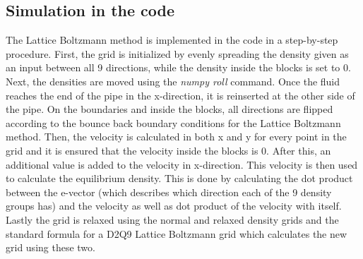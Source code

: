 \documentclass[a4paper]{article}
\begin{document}
\begin{multicols*}{2}
\subsection*{Simulation in the code}
The Lattice Boltzmann method is implemented in the code in a step-by-step procedure. First, the grid is initialized by evenly spreading the density given as an input between all 9 directions, while the density inside the blocks is set to 0. Next, the densities are moved using the \emph{numpy roll} command. Once the fluid reaches the end of the pipe in the x-direction, it is reinserted at the other side of the pipe.  On the boundaries and inside the blocks, all directions are flipped according to the bounce back boundary conditions for the Lattice Boltzmann method. Then, the velocity is calculated in both x and y for every point in the grid and it is ensured that the velocity inside the blocks is 0. After this, an additional value is added to the velocity in x-direction. This velocity is then used to calculate the equilibrium density. This is done by calculating the dot product between the e-vector (which describes which direction each of the 9 density groups has) and the velocity as well as dot product of the velocity with itself. Lastly the grid is relaxed using the normal and relaxed density grids and the standard formula for a D2Q9 Lattice Boltzmann grid which calculates the new grid using these two.

\end{multicols*}
\end{document}
